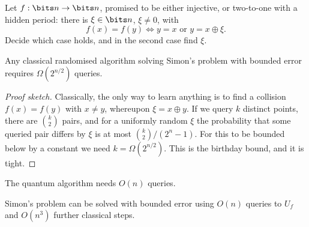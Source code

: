 \begin{problem*}[Simon]
	Let $f:\bits n\to\bits n$, promised to be either injective, or two-to-one with a hidden period: there is $\xi\in\bits n$, $\xi\neq0$, with
	$$f(x) = f(y) \iff y = x \text{ or } y = x\oplus\xi.$$
	Decide which case holds, and in the second case find $\xi$.
\end{problem*}

\begin{proposition}
	Any classical randomised algorithm solving Simon's problem with bounded error requires $\Omega(2^{n/2})$ queries.
\end{proposition}

\begin{proof}[Proof sketch]
	Classically, the only way to learn anything is to find a collision $f(x)=f(y)$ with $x\neq y$, whereupon $\xi = x\oplus y$. If we query $k$ distinct points, there are $\binom k2$ pairs, and for a uniformly random $\xi$ the probability that some queried pair differs by $\xi$ is at most $\binom k2/(2^n-1)$. For this to be bounded below by a constant we need $k = \Omega(2^{n/2})$. This is the birthday bound, and it is tight.
\end{proof}

The quantum algorithm needs $O(n)$ queries.

\begin{center}
\end{center}

\begin{theorem}[Simon]
	Simon's problem can be solved with bounded error using $O(n)$ queries to $U_f$ and $O(n^3)$ further classical steps.
\end{theorem}

